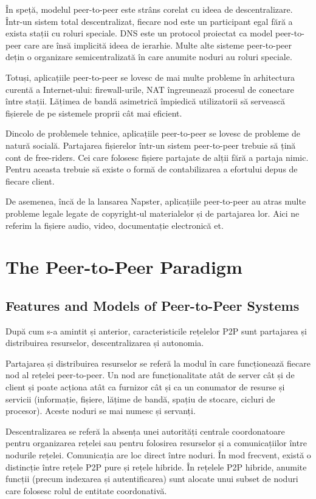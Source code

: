 În speță, modelul peer-to-peer este strâns corelat cu ideea de
descentralizare. Într-un sistem total descentralizat, fiecare nod este un
participant egal fără a exista stații cu roluri speciale. DNS este un protocol
proiectat ca model peer-to-peer care are însă implicită ideea de ierarhie.
Multe alte sisteme peer-to-peer dețin o organizare semicentralizată în care
anumite noduri au roluri speciale.

Totuși, aplicațiile peer-to-peer se lovesc de mai multe probleme în
arhitectura curentă a Internet-ului: firewall-urile, NAT îngreunează procesul
de conectare între stații. Lățimea de bandă asimetrică împiedică utilizatorii
să servească fișierele de pe sistemele proprii cât mai eficient.

Dincolo de problemele tehnice, aplicațiile peer-to-peer se lovesc de probleme
de natură socială. Partajarea fișierelor într-un sistem peer-to-peer trebuie
să țină cont de free-riders. Cei care folosesc fișiere partajate de alții fără
a partaja nimic. Pentru aceasta trebuie să existe o formă de contabilizarea a
efortului depus de fiecare client.

De asemenea, încă de la lansarea Napster, aplicațiile peer-to-peer au atras
multe probleme legale legate de copyright-ul materialelor și de partajarea
lor. Aici ne referim la fișiere audio, video, documentație electronică et.

\section{The Peer-to-Peer Paradigm}
\label{sec:p2p-systems:paragigm}

\subsection{Features and Models of Peer-to-Peer Systems}

După cum s-a amintit și anterior, caracteristicile rețelelor P2P sunt
partajarea și distribuirea resurselor, descentralizarea și autonomia.

Partajarea și distribuirea resurselor se referă la modul în care funcționează
fiecare nod al rețelei peer-to-peer. Un nod are funcționalitate atât de server
cât și de client și poate acționa atât ca furnizor cât și ca un conumator de
resurse și servicii (informație, fișiere, lățime de bandă, spațiu de stocare,
cicluri de procesor). Aceste noduri se mai numesc și servanți.

Descentralizarea se referă la absența unei autorități centrale coordonatoare
pentru organizarea rețelei sau pentru folosirea resurselor și a comunicațiilor
între nodurile rețelei. Comunicația are loc direct între noduri. În mod
frecvent, există o distincție între rețele P2P pure și rețele hibride. În
rețelele P2P hibride, anumite funcții (precum indexarea și autentificarea)
sunt alocate unui subset de noduri care folosesc rolul de entitate
coordonativă.

